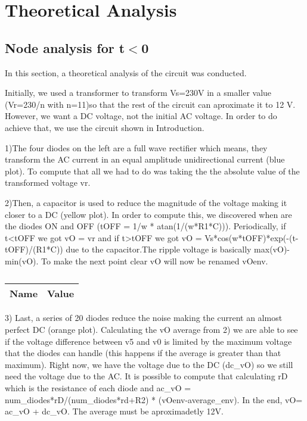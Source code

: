 \section{Theoretical Analysis} \label{section:theo}


\subsection{Node analysis for t$<$0}

\par In this section, a theoretical analysis of the circuit was conducted.

Initially, we used a transformer to transform Vs=230V in a smaller value (Vr=230/n with n=11)so that the rest of the circuit can aproximate it to 12 V. However, we want a DC voltage, not the initial AC voltage. In order to do achieve that, we use the circuit shown in Introduction.

1)The four diodes on the left are a full wave rectifier which means, they transform the AC current in an equal amplitude unidirectional current (blue plot). To compute that all we had to do was taking the the absolute value of the transformed voltage vr.



2)Then, a capacitor is used to reduce the magnitude of the voltage making it closer to a DC (yellow plot). In order to compute this, we discovered when are the diodes ON and OFF (tOFF = 1/w * atan(1/(w*R1*C))). Periodically, if t<tOFF we got vO = vr and if t>tOFF we got vO = Vs*cos(w*tOFF)*exp(-(t-tOFF)/(R1*C)) due to the capacitor.The ripple voltage is basically max(vO)-min(vO). To make the next point clear vO will now be renamed vOenv.

\begin{table}[ht]
  \centering
  \begin{tabular}{|l|r|}
    \hline    
    {\bf Name} & {\bf Value} \\ \hline
    
  \end{tabular}
  \caption{}
  \label{tab:p2}
\end{table}


3) Last, a series of 20 diodes reduce the noise making the current an almost perfect DC (orange plot). Calculating the vO average from 2) we are able to see if the voltage difference between v5 and v0 is limited by the maximum voltage that the diodes can handle (this happens if the average is greater than that maximum). Right now, we have the voltage due to the DC (dc_vO) so we still need the voltage due to the AC. It is possible to compute that calculating rD which is the resistance of each diode and ac_vO = num_diodes*rD/(num_diodes*rd+R2) * (vOenv-average_env). In the end, vO= ac_vO + dc_vO. The average must be aproximadetly 12V.

